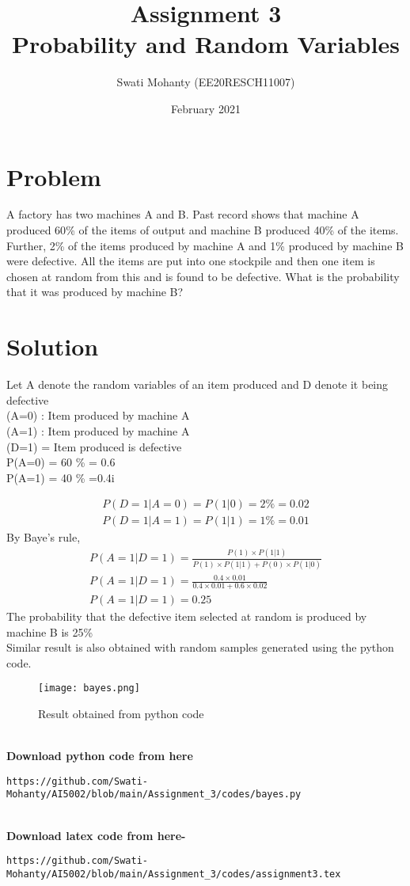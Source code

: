 \documentclass[journal,12pt,twocolumn]{IEEEtran}
\title{Assignment 3
\\Probability and Random Variables }
\author{Swati Mohanty (EE20RESCH11007) }
\date{February 2021}
\begin{document}
\maketitle


\section{Problem}
A factory has two machines A and B. Past
record shows that machine A produced
60{\%} of the items of output and machine
B produced 40{\%} of the items. Further, 2{\%}
of the items produced by machine A and
1{\%} produced by machine B were defective.
All the items are put into one stockpile and
then one item is chosen at random from this
and is found to be defective. What is the
probability that it was produced by machine B?

\section{Solution}
Let A denote the random variables of an item produced and D denote it being defective
\\(A=0) : Item produced by machine A
\\(A=1) : Item produced by machine A
\\(D=1) = Item produced is defective
\\P(A=0) = 60 {\%} = 0.6\\
P(A=1) = 40 {\%} =0.4i

\begin{align}
    P(D=1|A=0) = P(1|0) = 2 {\%} =0.02
   \\P(D=1|A=1) = P(1|1) =  1 {\%} =0.01
\end{align}
By Baye's rule,
\begin{align}
    P(A=1|D=1) = \frac{P(1)\times P(1|1)}{P(1)\times P(1|1) + P(0)\times P(1|0)}
    \\P(A=1|D=1) = \frac{0.4\times 0.01}{0.4\times 0.01 + 0.6\times 0.02}
    \\P(A=1|D=1) = 0.25
\end{align}
The probability that the defective item selected at random is produced by machine B is 25{\%}
\\Similar  result is also obtained with random samples generated using the python code.
\begin{figure}[h]
\renewcommand{\theenumi}{1}
\centering
\texttt{[image: bayes.png]}
\caption{Result obtained from python code }
\label{Fig:1}
\end{figure}
\\\textbf{Download python code from here}\\
\begin{lstlisting}
https://github.com/Swati-Mohanty/AI5002/blob/main/Assignment_3/codes/bayes.py
\end{lstlisting}
\\\textbf{Download latex code from here-}\\
\begin{lstlisting}
https://github.com/Swati-Mohanty/AI5002/blob/main/Assignment_3/codes/assignment3.tex
\end{lstlisting}
\end{document}
